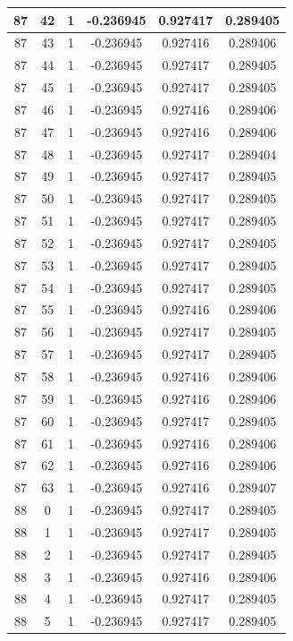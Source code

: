 \documentclass[12pt,a4paper]{article}
\numberwithin{equation}{section}
\numberwithin{figure}{section}
\numberwithin{table}{section}
\begin{document}
\begin{longtable}{|c|c|c|c|c|c|}
87 & 42 & 1 & -0.236945 & 0.927417 & 0.289405 \\ \hline
87 & 43 & 1 & -0.236945 & 0.927416 & 0.289406 \\ \hline
87 & 44 & 1 & -0.236945 & 0.927417 & 0.289405 \\ \hline
87 & 45 & 1 & -0.236945 & 0.927417 & 0.289405 \\ \hline
87 & 46 & 1 & -0.236945 & 0.927416 & 0.289406 \\ \hline
87 & 47 & 1 & -0.236945 & 0.927416 & 0.289406 \\ \hline
87 & 48 & 1 & -0.236945 & 0.927417 & 0.289404 \\ \hline
87 & 49 & 1 & -0.236945 & 0.927417 & 0.289405 \\ \hline
87 & 50 & 1 & -0.236945 & 0.927417 & 0.289405 \\ \hline
87 & 51 & 1 & -0.236945 & 0.927417 & 0.289405 \\ \hline
87 & 52 & 1 & -0.236945 & 0.927417 & 0.289405 \\ \hline
87 & 53 & 1 & -0.236945 & 0.927417 & 0.289405 \\ \hline
87 & 54 & 1 & -0.236945 & 0.927417 & 0.289405 \\ \hline
87 & 55 & 1 & -0.236945 & 0.927416 & 0.289406 \\ \hline
87 & 56 & 1 & -0.236945 & 0.927417 & 0.289405 \\ \hline
87 & 57 & 1 & -0.236945 & 0.927417 & 0.289405 \\ \hline
87 & 58 & 1 & -0.236945 & 0.927416 & 0.289406 \\ \hline
87 & 59 & 1 & -0.236945 & 0.927416 & 0.289406 \\ \hline
87 & 60 & 1 & -0.236945 & 0.927417 & 0.289405 \\ \hline
87 & 61 & 1 & -0.236945 & 0.927416 & 0.289406 \\ \hline
87 & 62 & 1 & -0.236945 & 0.927416 & 0.289406 \\ \hline
87 & 63 & 1 & -0.236945 & 0.927416 & 0.289407 \\ \hline
88 & 0 & 1 & -0.236945 & 0.927417 & 0.289405 \\ \hline
88 & 1 & 1 & -0.236945 & 0.927417 & 0.289405 \\ \hline
88 & 2 & 1 & -0.236945 & 0.927417 & 0.289405 \\ \hline
88 & 3 & 1 & -0.236945 & 0.927416 & 0.289406 \\ \hline
88 & 4 & 1 & -0.236945 & 0.927417 & 0.289405 \\ \hline
88 & 5 & 1 & -0.236945 & 0.927417 & 0.289405 \\ \hline

\end{longtable}
\end{document}
